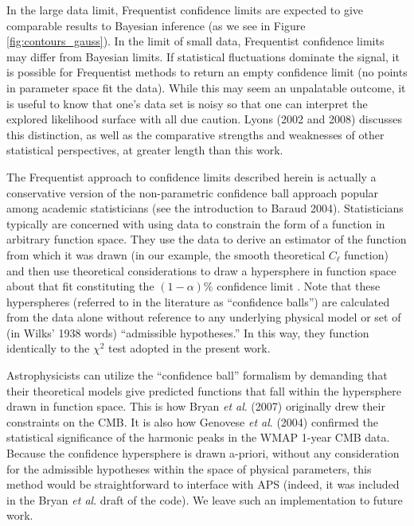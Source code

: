 \documentclass[useAMS,usenatbib]{aastex}
\newcommand{\APS}{APS }
\begin{document}
\begin{appendix}
In the large data limit, Frequentist confidence limits are expected to
give comparable results to Bayesian inference (as we see in Figure
\ref{fig:contours_gauss}).  In the limit of small data, Frequentist confidence limits
may differ from Bayesian limits.  If statistical fluctuations dominate the
signal, it is possible for Frequentist methods to return an empty confidence
limit (no points in parameter space fit the data).  While this may seem an
unpalatable outcome, it is useful to know that one's data set is noisy so that
one can interpret the explored likelihood surface with all due caution.
Lyons (2002 and 2008) discusses this distinction, as well as the
comparative strengths and weaknesses of other statistical perspectives, at
greater length than this work.

The Frequentist approach to confidence limits described herein
is actually a conservative version of
the non-parametric confidence ball approach popular among academic statisticians
(see the introduction to Baraud 2004).  Statisticians typically are concerned
with using data to constrain the form of a function in arbitrary function space.
They use the data to derive an estimator of the function 
from which it was drawn (in our example, the smooth theoretical $C_\ell$ function)
and then use
theoretical considerations to draw a hypersphere in function space about that
fit constituting the $(1-\alpha)\%$ confidence limit
\cite{bd,li,baraud,cai,davies}.
Note that these hyperspheres (referred to in the literature as ``confidence
balls'') are calculated from the data alone without reference to any
underlying physical model or set of (in Wilks' 1938 words) ``admissible
hypotheses.''  In this way, they function identically to the $\chi^2$ test
adopted in the present work.  

Astrophysicists can utilize the
``confidence ball'' formalism by demanding that their theoretical
models give predicted functions that fall within 
the hypersphere drawn in function space.  This is how
Bryan {\it et al}. (2007) originally drew their constraints on the CMB.  It is
also how Genovese {\it et al}. (2004) confirmed the statistical significance of
the harmonic peaks in the WMAP 1-year CMB data.  Because the confidence
hypersphere is drawn a-priori, without any consideration for the admissible
hypotheses within the space of physical parameters, this method would be
straightforward to interface with \APS (indeed, it was included in the Bryan
{\it et al}. draft of the code).  
We leave such an implementation to future work.


\end{appendix}
\end{document}
